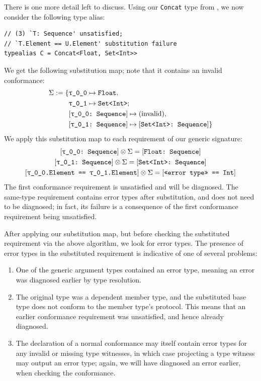 \documentclass[../generics]{subfiles}
\begin{document}
\begin{example}
There is one more detail left to discuss. Using our \texttt{Concat} type from , we now consider the following type alias:
\begin{Verbatim}
// (3) `T: Sequence' unsatisfied;
// `T.Element == U.Element' substitution failure
typealias C = Concat<Float, Set<Int>>
\end{Verbatim}
We get the following substitution map; note that it contains an invalid conformance:
\begin{align*}
\Sigma := \SubstMapC{
&\SubstType{\rT}{Float},\\
&\SubstType{\rU}{Set<Int>}
}{
\\
&\rTSequence \mapsto \text{(invalid)},\\
&\SubstConf{\rU}{Set<Int>}{Sequence}
}
\end{align*}
We apply this substitution map to each requirement of our generic signature:
\begin{gather*}
\rTSequence\otimes\Sigma = \ConfReq{Float}{Sequence}\\
\rUSequence\otimes\Sigma = \ConfReq{Set<Int>}{Sequence}\\
\SameReq{\rT.Element}{\rU.Element}\otimes\Sigma = \SameReq{<<error type>>}{Int}
\end{gather*}
The first conformance requirement is unsatisfied and will be diagnosed. The same-type requirement contains error types after substitution, and does not need to be diagnosed; in fact, its failure is a consequence of the first conformance requirement being unsatisfied.
\end{example}
After applying our substitution map, but before checking the substituted requirement via the above algorithm, we look for error types. The presence of error types in the substituted requirement is indicative of one of several problems:
\begin{enumerate}
\item One of the generic argument types contained an error type, meaning an error was diagnosed earlier by type resolution.
\item The original type was a dependent member type, and the substituted base type does not conform to the member type's protocol. This means that an earlier conformance requirement was unsatisfied, and hence already diagnosed.
\item The declaration of a normal conformance may itself contain error types for any invalid or missing type witnesses, in which case projecting a type witness may output an error type; again, we will have diagnosed an error earlier, when checking the conformance.
\end{enumerate}
\end{document}

